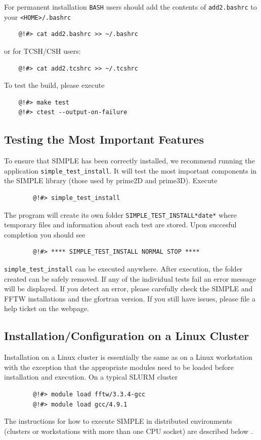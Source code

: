 \documentclass[a4paper,11pt]{article}
\begin{document}
\noindent{}For permanent installation \texttt{BASH} users should add the contents of \texttt{add2.bashrc} to your \texttt{<HOME>/.bashrc}
\begin{verbatim}
    @!#> cat add2.bashrc >> ~/.bashrc
\end{verbatim}
\noindent{}or for TCSH/CSH users:
\begin{verbatim}
    @!#> cat add2.tcshrc >> ~/.tcshrc
\end{verbatim}
\noindent{}To test the build, please execute
\begin{verbatim}
    @!#> make test
    @!#> ctest --output-on-failure
\end{verbatim}

\subsection{Testing the Most Important Features}

\noindent{}To ensure that SIMPLE has been correctly installed, we recommend running the application \texttt{simple\_test\_install}. It will test the most 
important components in the SIMPLE library  (those used by prime2D and  prime3D). Execute

\begin{verbatim}
        @!#> simple_test_install 
\end{verbatim}

\noindent{}The program will create its own folder \texttt{SIMPLE\_TEST\_INSTALL*date*} where temporary files and information about each 
test are stored. Upon succesful completion you should see

\begin{verbatim}
        @!#> **** SIMPLE_TEST_INSTALL NORMAL STOP ****
\end{verbatim}

\noindent{}\texttt{simple\_test\_install} can be executed anywhere. After execution, the folder created can be safely removed. If any of the individual 
tests fail an error message will be displayed. If you detect an error, please carefully check the SIMPLE and FFTW installations 
and the gfortran version. If you still have issues, please file a help ticket on the webpage.

\subsection{Installation/Configuration on a Linux Cluster}

Installation on a Linux cluster is essentially the same as on a Linux workstation with the exception that the appropriate modules need to be loaded before installation and execution. On a typical SLURM cluster
\begin{verbatim}
        @!#> module load fftw/3.3.4-gcc
        @!#> module load gcc/4.9.1
\end{verbatim}
The instructions for how to execute SIMPLE in distributed environments (clusters or workstations with more than one CPU socket) are described below \label{distr}.
\end{document}
